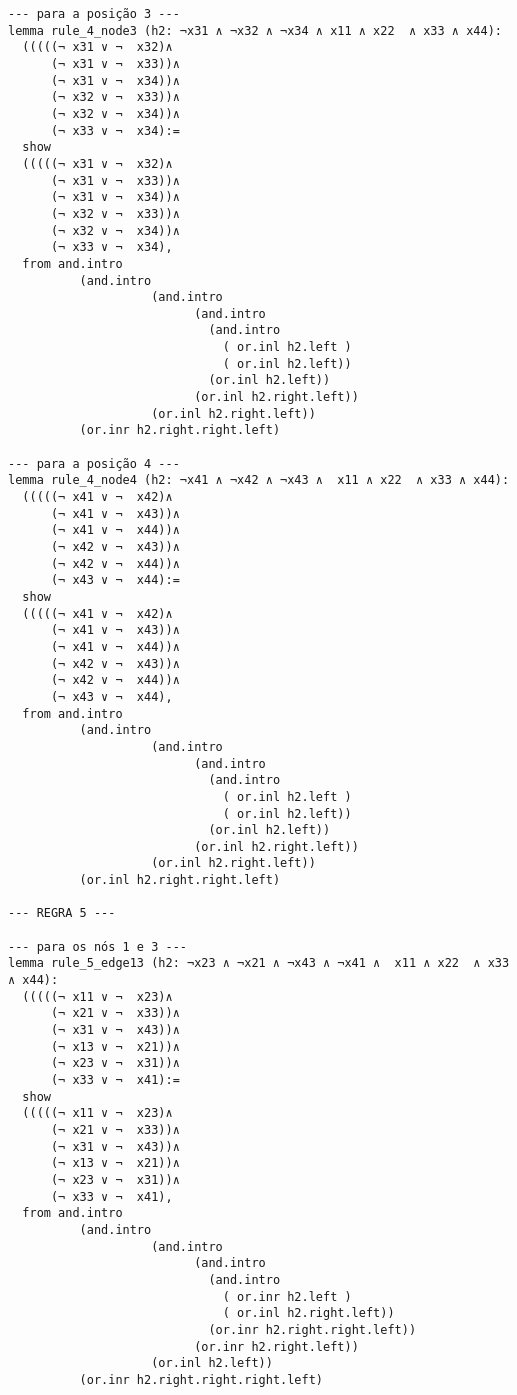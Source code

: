 \begin{enumerate}
\begin{lstlisting}
--- para a posição 3 ---
lemma rule_4_node3 (h2: ¬x31 ∧ ¬x32 ∧ ¬x34 ∧ x11 ∧ x22  ∧ x33 ∧ x44):
  (((((¬ x31 ∨ ¬  x32)∧
      (¬ x31 ∨ ¬  x33))∧ 
      (¬ x31 ∨ ¬  x34))∧ 
      (¬ x32 ∨ ¬  x33))∧ 
      (¬ x32 ∨ ¬  x34))∧ 
      (¬ x33 ∨ ¬  x34):=
  show
  (((((¬ x31 ∨ ¬  x32)∧
      (¬ x31 ∨ ¬  x33))∧ 
      (¬ x31 ∨ ¬  x34))∧ 
      (¬ x32 ∨ ¬  x33))∧ 
      (¬ x32 ∨ ¬  x34))∧ 
      (¬ x33 ∨ ¬  x34),
  from and.intro
          (and.intro
                    (and.intro
                          (and.intro
                            (and.intro
                              ( or.inl h2.left ) 
                              ( or.inl h2.left))
                            (or.inl h2.left))
                          (or.inl h2.right.left))
                    (or.inl h2.right.left))
          (or.inr h2.right.right.left)

--- para a posição 4 ---
lemma rule_4_node4 (h2: ¬x41 ∧ ¬x42 ∧ ¬x43 ∧  x11 ∧ x22  ∧ x33 ∧ x44):
  (((((¬ x41 ∨ ¬  x42)∧
      (¬ x41 ∨ ¬  x43))∧ 
      (¬ x41 ∨ ¬  x44))∧ 
      (¬ x42 ∨ ¬  x43))∧ 
      (¬ x42 ∨ ¬  x44))∧ 
      (¬ x43 ∨ ¬  x44):=
  show
  (((((¬ x41 ∨ ¬  x42)∧
      (¬ x41 ∨ ¬  x43))∧ 
      (¬ x41 ∨ ¬  x44))∧ 
      (¬ x42 ∨ ¬  x43))∧ 
      (¬ x42 ∨ ¬  x44))∧ 
      (¬ x43 ∨ ¬  x44),
  from and.intro
          (and.intro
                    (and.intro
                          (and.intro
                            (and.intro
                              ( or.inl h2.left ) 
                              ( or.inl h2.left))
                            (or.inl h2.left))
                          (or.inl h2.right.left))
                    (or.inl h2.right.left))
          (or.inl h2.right.right.left)

--- REGRA 5 ---

--- para os nós 1 e 3 ---
lemma rule_5_edge13 (h2: ¬x23 ∧ ¬x21 ∧ ¬x43 ∧ ¬x41 ∧  x11 ∧ x22  ∧ x33 ∧ x44):
  (((((¬ x11 ∨ ¬  x23)∧
      (¬ x21 ∨ ¬  x33))∧ 
      (¬ x31 ∨ ¬  x43))∧ 
      (¬ x13 ∨ ¬  x21))∧ 
      (¬ x23 ∨ ¬  x31))∧ 
      (¬ x33 ∨ ¬  x41):=
  show
  (((((¬ x11 ∨ ¬  x23)∧
      (¬ x21 ∨ ¬  x33))∧ 
      (¬ x31 ∨ ¬  x43))∧ 
      (¬ x13 ∨ ¬  x21))∧ 
      (¬ x23 ∨ ¬  x31))∧ 
      (¬ x33 ∨ ¬  x41),
  from and.intro
          (and.intro
                    (and.intro
                          (and.intro
                            (and.intro
                              ( or.inr h2.left ) 
                              ( or.inl h2.right.left))
                            (or.inr h2.right.right.left))
                          (or.inr h2.right.left))
                    (or.inl h2.left))
          (or.inr h2.right.right.right.left)


\end{lstlisting}
\end{enumerate}
